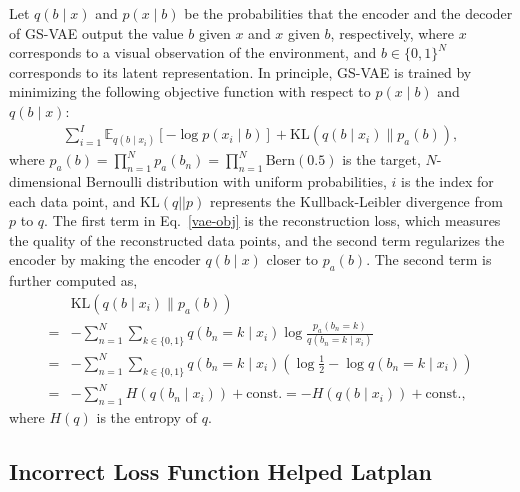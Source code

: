 
Let $q(b \mid x)$ and $p(x \mid b)$ be the probabilities that the encoder and the decoder of GS-VAE output the value $b$ given $x$ and $x$ given $b$, respectively,
where $x$ corresponds to a visual observation of the environment, and $b\in\{0,1\}^N$ corresponds to its latent representation.
In principle, GS-VAE is trained by minimizing the following objective function with respect to $p(x \mid b)$ and $q(b\mid x)$:
\begin{align}
\label{vae-obj} \sum_{i=1}^I \mathbb{E}_{q(b\mid x_i)}\left[-\log p(x_i\mid b)\right] + \mathrm{KL}(q(b\mid x_i) \parallel p_a(b)),
\end{align}
where $p_a(b) = \prod_{n=1}^N p_a(b_n) = \prod_{n=1}^N \mathrm{Bern}(0.5)$ is the target, $N$-dimensional Bernoulli distribution with uniform probabilities, 
$i$ is the index for each data point, and $\mathrm{KL}(q || p)$ represents the Kullback-Leibler divergence from $p$ to $q$.
The first term in Eq.~\eqref{vae-obj} is the reconstruction loss, which measures the quality of the reconstructed data points,
and the second term regularizes the encoder by making the encoder $q(b\mid x)$ closer to $p_a(b)$.
The second term is further computed as,
\begin{align*}
 &{\mathrm{KL}}(q(b\mid x_i) \parallel p_a(b)) \\
= & - \sum_{n=1}^N \sum_{k\in\{0,1\}}q(b_{n}=k \mid x_i) \log\frac{p_a(b_{n}=k)}{q(b_{n}=k \mid x_i)}\\
=& - \sum_{n=1}^N \sum_{k\in\{0,1\}}q(b_{n}=k \mid x_i) \left(\log \frac{1}{2} - \log{q(b_{n}=k \mid x_i)}\right)\\
=& - \sum_{n=1}^N H(q(b_n\mid x_i)) + \mathrm{const.} = -H(q(b \mid x_i)) + \mathrm{const.},
\end{align*}
where $H(q)$ is the entropy of $q$.

\subsection{Incorrect Loss Function Helped Latplan}

